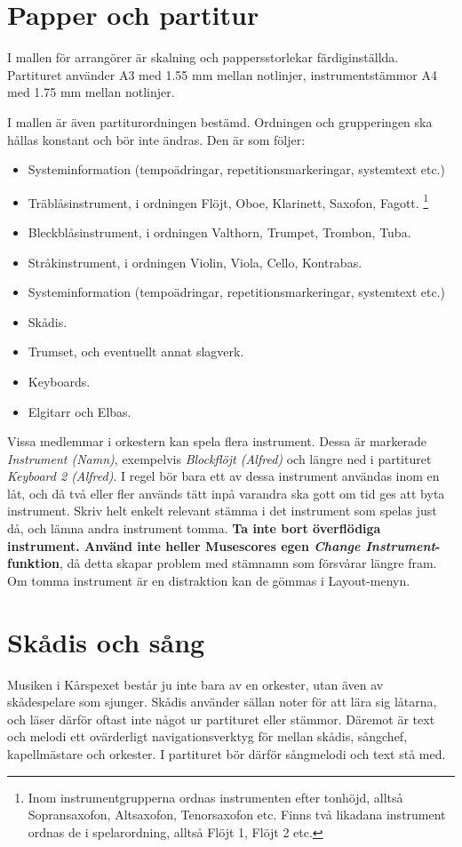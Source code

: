 \newpage
\section{Papper och partitur}
I mallen för arrangörer är skalning och pappersstorlekar färdiginställda. Partituret använder A3 med 1.55 mm mellan notlinjer, instrumentstämmor A4 med 1.75 mm mellan notlinjer. 

I mallen är även partiturordningen bestämd. Ordningen och grupperingen ska hållas konstant och bör inte ändras. Den är som följer:
\begin{itemize}
    \item Systeminformation (tempoädringar, repetitionsmarkeringar, systemtext etc.)
    \item Träblåsinstrument, i ordningen Flöjt, Oboe, Klarinett, Saxofon, Fagott. \footnote{\label{inom}Inom instrumentgrupperna ordnas instrumenten efter tonhöjd, alltså Sopransaxofon, Altsaxofon, Tenorsaxofon etc. Finns två likadana instrument ordnas de i spelarordning, alltså Flöjt 1, Flöjt 2 etc.}
    \item Bleckblåsinstrument, i ordningen Valthorn, Trumpet, Trombon, Tuba. \footnotemark[1]
    \item Stråkinstrument, i ordningen Violin, Viola, Cello, Kontrabas. \footnotemark[1]
    \item Systeminformation (tempoädringar, repetitionsmarkeringar, systemtext etc.)
    \item Skådis.
    \item Trumset, och eventuellt annat slagverk.
    \item Keyboards.
    \item Elgitarr och Elbas.
\end{itemize}

Vissa medlemmar i orkestern kan spela flera instrument. Dessa är markerade \textit{Instrument (Namn)}, exempelvis \textit{Blockflöjt (Alfred)} och längre ned i partituret \textit{Keyboard 2 (Alfred)}. I regel bör bara ett av dessa instrument användas inom en låt, och då två eller fler används tätt inpå varandra ska gott om tid ges att byta instrument. Skriv helt enkelt relevant stämma i det instrument som spelas just då, och lämna andra instrument tomma. \textbf{Ta inte bort överflödiga instrument. Använd inte heller Musescores egen \textit{Change Instrument}-funktion}, då detta skapar problem med stämnamn som försvårar längre fram. Om tomma instrument är en distraktion kan de gömmas i Layout-menyn.

\newpage
\section{Skådis och sång}
Musiken i Kårspexet består ju inte bara av en orkester, utan även av skådespelare som sjunger. Skådis använder sällan noter för att lära sig låtarna, och läser därför oftast inte något ur partituret eller stämmor. Däremot är text och melodi ett ovärderligt navigationsverktyg för mellan skådis, sångchef, kapellmästare och orkester. I partituret bör därför sångmelodi och text stå med. 

